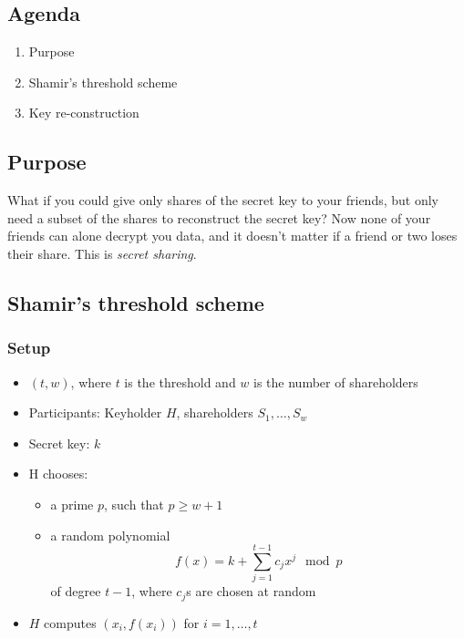 

\subsection*{Agenda}
\begin{enumerate}
\item Purpose
\item Shamir's threshold scheme
\item Key re-construction
\end{enumerate}

\subsection{Purpose}
What if you could give  only shares of the secret key to your
friends, but only need a subset of the shares to reconstruct the
secret key? Now none of your friends can alone decrypt you data, and
it doesn't matter if a friend or two loses their share. This is
\emph{secret sharing}.

\subsection{Shamir's threshold scheme}
\subsubsection*{Setup}
\begin{itemize}
\item $(t, w)$, where $t$ is the threshold and $w$ is the number of shareholders
\item Participants: Keyholder $H$, shareholders $S_1, \ldots, S_w$
\item Secret key: $k$
\item H chooses:
  \begin{itemize}
  \item a prime $p$, such that $p \ge w + 1$
  \item a random polynomial
    \[
    f(x) = k + \sum\limits_{j=1}^{t-1} c_jx^j \mod p
    \]
    of degree $t-1$, where $c_j$s are chosen at random
  \end{itemize}
\item $H$ computes $(x_i, f(x_i))$ for $i  = 1, \ldots, t$
\end{itemize}

